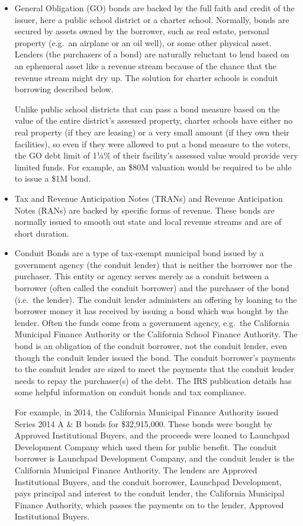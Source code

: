 \begin{itemize}
  \item General Obligation (GO) bonds are backed by the full faith and credit of the issuer, here a public school district or a charter school. Normally, bonds are secured by assets owned by the borrower, such as real estate, personal property (e.g.\ an airplane or an oil well), or some other physical asset. Lenders (the purchasers of a bond) are naturally reluctant to lend based on an ephemeral asset like a revenue stream because of the chance that the revenue stream might dry up. The solution for charter schools is conduit borrowing described below.

  Unlike public school districts that can pass a bond measure based on the value of the entire district's assessed property, charter schools have either no real property (if they are leasing) or a very small amount (if they own their facilities), so even if they were allowed to put a bond measure to the voters, the GO debt limit of 1¼\% of their facility's assessed value would provide very limited funds. For example, an \$80M valuation would be required to be able to issue a \$1M bond. 

  \item Tax and Revenue Anticipation Notes (TRANs) and Revenue Anticipation Notes (RANs) are backed by specific forms of revenue. These bonds are normally issued to smooth out state and local revenue streams and are of short duration.
  
  \item Conduit Bonds are a type of tax-exempt municipal bond issued by a government agency (the conduit lender) that is neither the borrower nor the purchaser. This entity or agency serves merely as a conduit between a borrower (often called the conduit borrower) and the purchaser of the bond (i.e.~the lender). The conduit lender administers an offering by loaning to the borrower money it has received by issuing a bond which was bought by the lender. Often the funds come from a government agency, e.g.~the California Municipal Finance Authority or the California School Finance Authority. The bond is an obligation of the conduit borrower, not the conduit lender, even though the conduit lender issued the bond. The conduit borrower's payments to the conduit lender are sized to meet the payments that the conduit lender needs to repay the purchaser(s) of the debt. The IRS publication  details has some helpful information on conduit bonds and tax compliance.

For example, in 2014, the California Municipal Finance Authority issued Series 2014 A \& B bonds for \$32,915,000. These bonds were bought by Approved Institutional Buyers, and the proceeds were loaned to Launchpad Development Company which used them for public benefit. The conduit borrower is Launchpad Development Company, and the conduit lender is the California Municipal Finance Authority. The lenders are Approved Institutional Buyers, and the conduit borrower, Launchpad Development, pays principal and interest to the conduit lender, the California Municipal Finance Authority, which passes the payments on to the lender, Approved Institutional Buyers.
\end{itemize}
